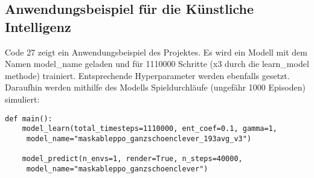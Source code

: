 \subsection{Anwendungsbeispiel für die Künstliche Intelligenz}
\begin{minipage}{\linewidth}
Code 27 zeigt ein Anwendungsbeispiel des Projektes. Es  wird ein Modell mit dem Namen model\_name geladen und für 1110000 Schritte (x3 durch die learn\_model methode) trainiert. Entsprechende Hyperparameter werden ebenfalls gesetzt. Daraufhin werden mithilfe des Modells Spieldurchläufe (ungefähr 1000 Episoden) simuliert:
\vspace{0.5cm}
\begin{lstlisting}[caption={Anwendungsbeispiel für die Verwendung der Künstlichen Intelligenz}]
def main():
	model_learn(total_timesteps=1110000, ent_coef=0.1, gamma=1, 
	 model_name="maskableppo_ganzschoenclever_193avg_v3")
	
	model_predict(n_envs=1, render=True, n_steps=40000,
	 model_name="maskableppo_ganzschoenclever")
\end{lstlisting}
\end{minipage}